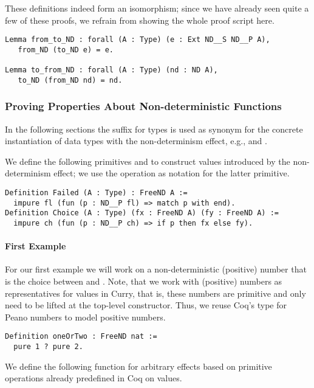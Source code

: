 These definitions indeed form an isomorphism; since we have already seen quite a few of these proofs, we refrain from showing the whole proof script here.

\begin{verbatim}
Lemma from_to_ND : forall (A : Type) (e : Ext ND__S ND__P A),
   from_ND (to_ND e) = e.

Lemma to_from_ND : forall (A : Type) (nd : ND A),
   to_ND (from_ND nd) = nd.
\end{verbatim}

\subsubsection{Proving Properties About Non-deterministic Functions}

In the following sections the suffix  for types is used as synonym for the concrete instantiation of data types with the non-determinism effect, e.g.,  and .

We define the following primitives  and  to construct values introduced by the non-determinism effect; we use the operation  as notation for the latter primitive.

\begin{verbatim}
Definition Failed (A : Type) : FreeND A :=
  impure fl (fun (p : ND__P fl) => match p with end).
Definition Choice (A : Type) (fx : FreeND A) (fy : FreeND A) :=
  impure ch (fun (p : ND__P ch) => if p then fx else fy).
\end{verbatim}

\paragraph{First Example}
\label{par:firstNDExample}
For our first example we will work on a non-deterministic (positive) number that is the choice between  and .
Note, that we work with (positive) numbers as representatives for  values in Curry, that is, these numbers are primitive and only need to be lifted at the top-level constructor.
Thus, we reuse Coq's type for Peano numbers  to model positive numbers.

\begin{verbatim}
Definition oneOrTwo : FreeND nat :=
  pure 1 ? pure 2.
\end{verbatim}

We define the following function  for arbitrary effects based on primitive operations already predefined in Coq on  values.

